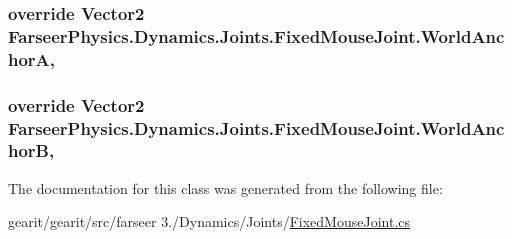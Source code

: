 \hypertarget{class_farseer_physics_1_1_dynamics_1_1_joints_1_1_fixed_mouse_joint_a54c1f2aef9425006b3ed6345d72a67d8}{
\subsubsection[{World\+Anchor\+A}]{\setlength{\rightskip}{0pt plus 5cm}override Vector2 Farseer\+Physics.\+Dynamics.\+Joints.\+Fixed\+Mouse\+Joint.\+World\+Anchor\+A\hspace{0.3cm}{\ttfamily [get]}, {\ttfamily [set]}}}\label{class_farseer_physics_1_1_dynamics_1_1_joints_1_1_fixed_mouse_joint_a54c1f2aef9425006b3ed6345d72a67d8}
\hypertarget{class_farseer_physics_1_1_dynamics_1_1_joints_1_1_fixed_mouse_joint_a65b1f1ec7c9ef075ea581311eb1b6cf1}{
\subsubsection[{World\+Anchor\+B}]{\setlength{\rightskip}{0pt plus 5cm}override Vector2 Farseer\+Physics.\+Dynamics.\+Joints.\+Fixed\+Mouse\+Joint.\+World\+Anchor\+B\hspace{0.3cm}{\ttfamily [get]}, {\ttfamily [set]}}}\label{class_farseer_physics_1_1_dynamics_1_1_joints_1_1_fixed_mouse_joint_a65b1f1ec7c9ef075ea581311eb1b6cf1}


The documentation for this class was generated from the following file\+:\begin{DoxyCompactItemize}
\item 
gearit/gearit/src/farseer 3./\+Dynamics/\+Joints/\hyperlink{_fixed_mouse_joint_8cs}{Fixed\+Mouse\+Joint.\+cs}\end{DoxyCompactItemize}
